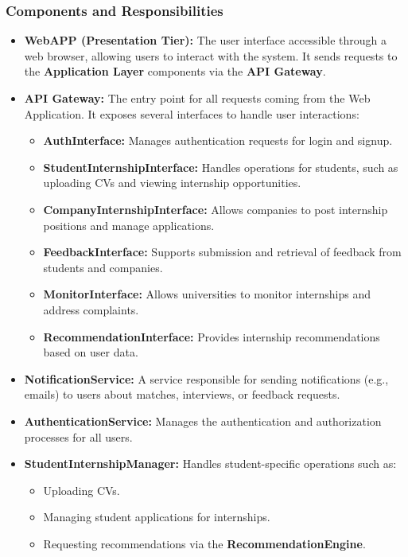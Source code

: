 \subsubsection{Components and Responsibilities}
\begin{itemize}
    \item \textbf{WebAPP (Presentation Tier):}
    The user interface accessible through a web browser, allowing users to interact with the system. It sends requests to the \textbf{Application Layer} components via the \textbf{API Gateway}.

    \item \textbf{API Gateway:}
    The entry point for all requests coming from the Web Application. It exposes several interfaces to handle user interactions:
    \begin{itemize}
        \item \textbf{AuthInterface:} Manages authentication requests for login and signup.
        \item \textbf{StudentInternshipInterface:} Handles operations for students, such as uploading CVs and viewing internship opportunities.
        \item \textbf{CompanyInternshipInterface:} Allows companies to post internship positions and manage applications.
        \item \textbf{FeedbackInterface:} Supports submission and retrieval of feedback from students and companies.
        \item \textbf{MonitorInterface:} Allows universities to monitor internships and address complaints.
        \item \textbf{RecommendationInterface:} Provides internship recommendations based on user data.
    \end{itemize}

    \item \textbf{NotificationService:}
    A service responsible for sending notifications (e.g., emails) to users about matches, interviews, or feedback requests.

    \item \textbf{AuthenticationService:}
    Manages the authentication and authorization processes for all users.

    \item \textbf{StudentInternshipManager:}
    Handles student-specific operations such as:
    \begin{itemize}
        \item Uploading CVs.
        \item Managing student applications for internships.
        \item Requesting recommendations via the \textbf{RecommendationEngine}.
    \end{itemize}


\end{itemize}
